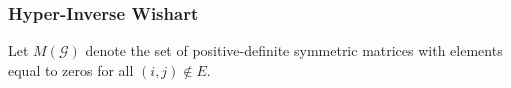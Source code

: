 \begin{frame}
  \frametitle{Hyper-Inverse Wishart}
  Let $M(\mathcal G)$ denote the set of positive-definite symmetric matrices with elements equal to zeros for all $(i, j)\not\in E$. 
\end{frame}
